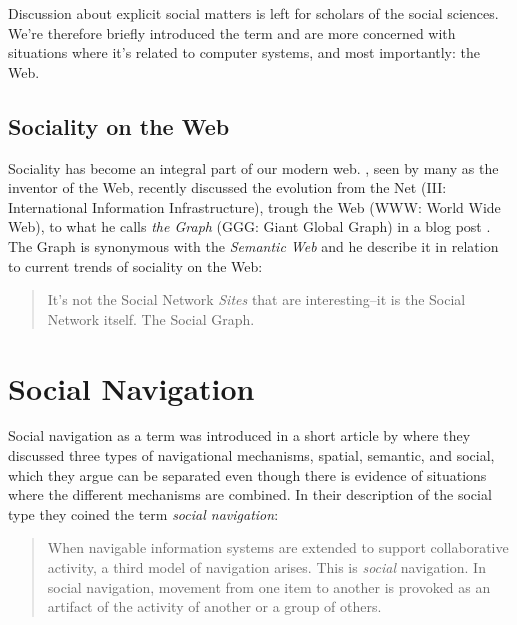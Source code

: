 Discussion about explicit social matters is left for scholars of the social
sciences. We're therefore briefly introduced the term and are more concerned
with situations where it's related to computer systems, and most importantly:
the Web.

\subsection{Sociality on the Web}

Sociality has become an integral part of our modern web.
\citeauthor{bernerslee07}, seen by many as the inventor of the Web,
recently discussed the evolution from the Net (III: International
Information Infrastructure), trough the Web (WWW: World Wide Web),
to what he calls \emph{the Graph} (GGG: Giant Global Graph) in a
blog post \citeyearpar{bernerslee07}. The Graph is synonymous with the
\emph{Semantic Web} \citep{bernerslee01} and he describe it in relation to
current trends of sociality on the Web:
\begin{quote}
  It's not the Social Network \emph{Sites} that are interesting--it is the
  Social Network itself. The Social Graph. \citep{bernerslee01}
\end{quote}


\section{Social Navigation}
\label{section:background.social.navigation}

Social navigation as a term was introduced in a short article by
\citet{dourish94} where they discussed three types of navigational mechanisms,
spatial, semantic, and social, which they argue can be separated even though
there is evidence of situations where the different mechanisms are combined.
In their description of the social type they coined the term
\emph{social navigation}:

\begin{quote}
  When navigable information systems are extended to support collaborative
  activity, a third model of navigation arises. This is \emph{social}
  navigation. In social navigation, movement from one item to another is
  provoked as an artifact of the activity of another or a group of others.
  \citep[p.~1]{dourish94}
\end{quote}

